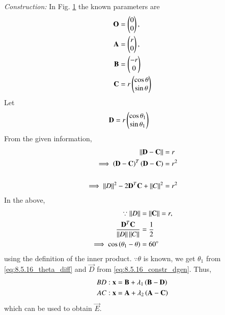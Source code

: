 
\begin{figure}[!ht]
\centering
\resizebox{\columnwidth}{!}{}
\caption{}
\label{fig:8.5.16_circle_latex}	
\end{figure}
%
%
%
\item {\em Construction: }In Fig. \ref{fig:8.5.16_circle_latex} the known parameters are
\\
%
\begin{align}
\mathbf{O} &= \begin{pmatrix}0\\0\end{pmatrix} ,
\\
\mathbf{A} &= \begin{pmatrix}r\\0\end{pmatrix} ,
\label{eq:8.5.16_constr_a}
\\
 \mathbf{B} &= \begin{pmatrix}-r\\0\end{pmatrix} 
\label{eq:8.5.16_constr_b}
\\
\mathbf{C}&= r\begin{pmatrix}\cos\theta\\\sin\theta\end{pmatrix}
\label{eq:8.5.16_constr_cgen}
\end{align}
%
Let 
\begin{align}
\mathbf{D} & = r\begin{pmatrix}\cos\theta_1\\\sin\theta_1\end{pmatrix} 
\end{align}
From the given information,
\begin{align}
 \left\lVert\mathbf{D} - \mathbf{C}\right\rVert &= r
\\
\implies \left(\mathbf{D} - \mathbf{C}\right)^T\left(\mathbf{D} - \mathbf{C}\right) &= r^2\\
 \label{eq:8.5.16_dist_formula}
\\
\implies  \left\lVert D\right\rVert ^2 - 2\mathbf{D}^T\mathbf{C} +  \left\lVert C\right\rVert^2 &=r^2 
\end{align}
In the above, 
\begin{align}
\because \left\lVert D\right\rVert &= \left\lVert\mathbf{C}\right\rVert = r,
\\
\frac{\mathbf{D}^T\mathbf{C}}{\left\lVert D\right\rVert\left\lVert C\right\rVert}  &= \frac{1}{2}
\\
\implies \cos \left(\theta_1-\theta\right) &= 60 \degree
\label{eq:8.5.16_theta_diff}
\end{align}
using the definition of the inner product.  $\because \theta$ is known, we get $\theta_1$ from \eqref{eq:8.5.16_theta_diff}
and $\vec{D}$ from 
\eqref{eq:8.5.16_constr_dgen}. 
%
\subitem Thus,
\begin{align}
BD: \mathbf{x} &= \mathbf{B} + \lambda_1 \left(\mathbf{B}-\mathbf{D}\right)
\\
AC: \mathbf{x} &= \mathbf{A} + \lambda_2 \left(\mathbf{A}-\mathbf{C}\right)
\end{align}
%
which can be used to obtain $\vec{E}$.

